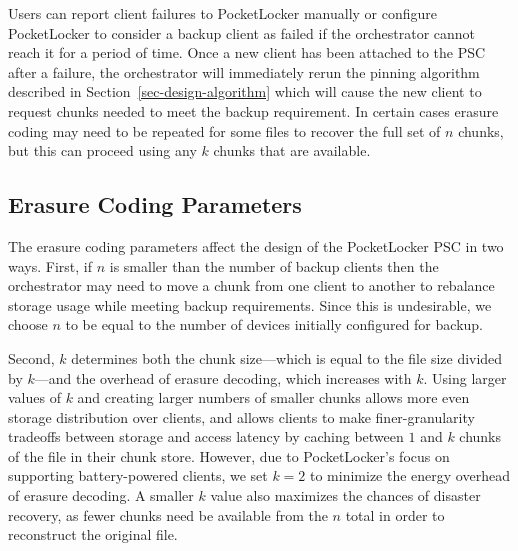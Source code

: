Users can report client failures to PocketLocker manually or configure
PocketLocker to consider a backup client as failed if the orchestrator cannot
reach it for a period of time. Once a new client has been attached to the PSC
after a failure, the orchestrator will immediately rerun the pinning
algorithm described in Section~\ref{sec-design-algorithm} which will cause
the new client to request chunks needed to meet the backup requirement. In
certain cases erasure coding may need to be repeated for some files to
recover the full set of $n$ chunks, but this can proceed using any $k$ chunks
that are available.

\subsection{Erasure Coding Parameters}

The erasure coding parameters affect the design of the PocketLocker PSC in
two ways. First, if $n$ is smaller than the number of backup clients then the
orchestrator may need to move a chunk from one client to another to rebalance
storage usage while meeting backup requirements. Since this is undesirable,
we choose $n$ to be equal to the number of devices initially configured for
backup.

Second, $k$ determines both the chunk size---which is equal to the file size
divided by $k$---and the overhead of erasure decoding, which increases with
$k$. Using larger values of $k$ and creating larger numbers of smaller chunks
allows more even storage distribution over clients, and allows clients to
make finer-granularity tradeoffs between storage and access latency by
caching between $1$ and $k$ chunks of the file in their chunk store. However,
due to PocketLocker's focus on supporting battery-powered clients, we set $k
= 2$ to minimize the energy overhead of erasure decoding. A smaller $k$ value
also maximizes the chances of disaster recovery, as fewer chunks need be
available from the $n$ total in order to reconstruct the original file.


